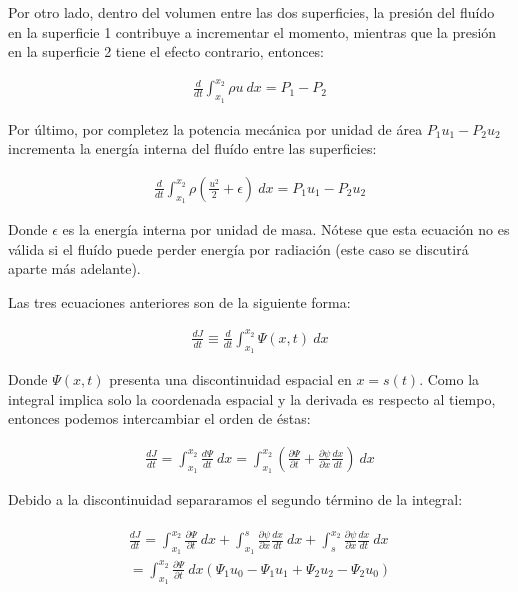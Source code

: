 Por otro lado, dentro del volumen entre las dos superficies, la presión del fluído en la superficie 1 contribuye a incrementar el momento, mientras que la presión en la superficie 2 tiene el efecto contrario, entonces:

\begin{align}
  \frac{d}{dt}\int^{x_2}_{x_1} \rho u~dx = P_1 - P_2 \label{eq:u-rho-dx}
\end{align}

Por último, por completez la potencia mecánica por unidad de área $P_1u_1 - P_2u_2$ incrementa la energía interna del fluído entre las superficies:

\begin{align}
  \frac{d}{dt}\int^{x_2}_{x_1} \rho\left(\frac{u^2}{2} + \epsilon\right)~dx = P_1u_1 - P_2u_2 \label{eq:rho-u2-epsilon-dx}
\end{align}

Donde $\epsilon$ es la energía interna por unidad de masa. Nótese que esta ecuación no es válida si el fluído puede perder energía por radiación (este caso se discutirá aparte más adelante).

Las tres ecuaciones anteriores son de la siguiente forma:

\begin{align}
  \frac{dJ}{dt} \equiv \frac{d}{dt}\int^{x_2}_{x_1} \Psi(x, t)~dx
\end{align}

Donde $\Psi(x, t)$ presenta una discontinuidad espacial en $x=s(t)$. Como la integral implica solo la coordenada espacial y la derivada es respecto al tiempo, entonces podemos intercambiar el orden de éstas:

\begin{align}
    \frac{dJ}{dt} = \int^{x_2}_{x_1} \frac{d\Psi}{dt}~dx = \int^{x_2}_{x_1} \left(\frac{\partial\Psi}{\partial t} + \frac{\partial\psi}{\partial x}\frac{dx}{dt}\right)~dx
\end{align}

Debido a la discontinuidad separaramos el segundo término de la integral:

\begin{align}
  \begin{split}
    \frac{dJ}{dt} = \int^{x_2}_{x_1} \frac{\partial\Psi}{\partial t}~dx + \int^{s}_{x_1}\frac{\partial\psi}{\partial x}\frac{dx}{dt}~dx +  \int^{x_2}_{s}\frac{\partial\psi}{\partial x}\frac{dx}{dt}~dx \\= \int^{x_2}_{x_1}\frac{\partial\Psi}{\partial t}~dx\left(\Psi_1u_0-\Psi_1u_1+\Psi_2u_2-\Psi_2u_0\right) \label{eq:dj-dt}
    \end{split}
\end{align}

